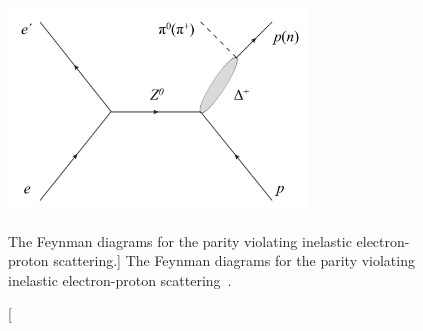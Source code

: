 %
%
%

\begin{singlespace}
\begin{figure}[h]
	\begin{center}
	\includegraphics[width=8.0cm]{figures/FeynmanDiagramsPVN2Delta}
	\end{center}
	\caption
	[The Feynman diagrams for the parity violating inelastic electron-proton scattering.]
	{The Feynman diagrams for the parity violating inelastic electron-proton scattering~\cite{leacock_qweak}.}
	\label{fig:FeynmanDiagramsPVN2Delta}
\end{figure}
\end{singlespace}


